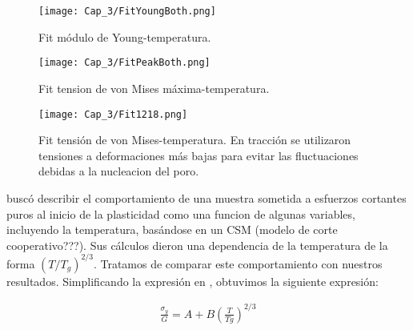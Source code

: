 
\begin{figure}[htp]
\centering
\texttt{[image: Cap\_3/FitYoungBoth.png]}
\caption[Fit módulo de Young-temperatura.]{Fit módulo de Young-temperatura.}
\label{C3:fg:youngVsT}
\end{figure}

\begin{figure}[htp]
\centering
\texttt{[image: Cap\_3/FitPeakBoth.png]}
\caption[Fit tension de von Mises máxima-temperatura.]{Fit tension de von Mises máxima-temperatura.}
\label{C3:fg:peakVMisesVsT}
\end{figure}

\begin{figure}[htp]
\centering
\texttt{[image: Cap\_3/Fit1218.png]}
\caption[Fit tensión de von Mises-temperatura.]{Fit tensión de von Mises-temperatura. En tracción se utilizaron tensiones a deformaciones más bajas para evitar las fluctuaciones debidas a la nucleacion del poro.}
\label{C3:fg:peakVMises1218VsT}
\end{figure} 

\cite{cheng11} buscó describir el comportamiento de una muestra sometida a esfuerzos cortantes puros al inicio de la plasticidad  como una funcion de algunas variables, incluyendo la temperatura, basándose en un CSM (modelo de corte cooperativo???). Sus cálculos dieron una dependencia de la temperatura de la forma $(T/T_g)^{2/3}$. Tratamos de comparar este comportamiento con nuestros resultados. Simplificando la expresión en \cite{cheng11}, obtuvimos la siguiente expresión:


\begin{eqnarray}
\frac{\sigma{}_{y}}{G} = A+B\left( \frac{T}{Tg} \right)^{2/3}
\label{C3:eq:onsetPlast}
\end{eqnarray}

